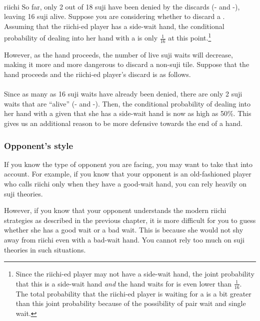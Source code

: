 {{\bp
\bei\fa{}\\
\hspace{70pt}\footnotesize{{\jap riichi}}
\ep
So far, only 2 out of 18 {\jap suji} have been denied by the discards ({\large{}-} and {\large{}-}), leaving 16 {\jap suji} alive. Suppose you are considering whether to discard a {\large{}}. Assuming that the {\jap riichi}-ed player has a side-wait hand, the conditional probability of dealing into her hand with a {\large{}} is only $\frac{1}{16}$ at this point.\footnote{Since the {\jap riichi}-ed player may not have a side-wait hand, the joint probability that this is a side-wait hand \emph{and} the hand waits for  is even lower than $\frac{1}{16}$. The total probability that the {\jap riichi}-ed player is waiting for a  is a bit greater than this joint probability because of the possibility of pair wait and single wait.}

\bigskip
However, as the hand proceeds, the number of live {\jap suji} waits will decrease, making it more and more dangerous to discard a non-{\jap suji} tile. Suppose that the hand proceeds and the {\jap riichi}-ed player's discard is as follows. 
\bp
\bei\fa{}\\
\vspace{-10pt}
\hspace{-5pt}\\
\vspace{-10pt}
\hspace{-115pt}
\ep
Since as many as 16 {\jap suji} waits have already been denied, there are only 2 {\jap suji} waits that are ``alive'' ({\large{}-} and {\large{}-}). Then, the conditional probability of dealing into her hand with a {\large{}} given that she has a side-wait hand is now as high as 50\%. This gives us an additional reason to be more defensive towards the end of a hand. 

\subsubsection*{Opponent's style}
If you know the type of opponent you are facing, you may want to take that into account. For example, if you know that your opponent is an old-fashioned player who calls {\jap riichi} only when they have a good-wait hand, you can rely heavily on {\jap suji} theories. 

\bigskip
However, if you know that your opponent understands the modern {\jap riichi} strategies as described in the previous chapter, it is more difficult for you to guess whether she has a good wait or a bad wait. This is because she would not shy away from {\jap riichi} even with a bad-wait hand. You cannot rely too much on {\jap suji} theories in such situations. 

}}
